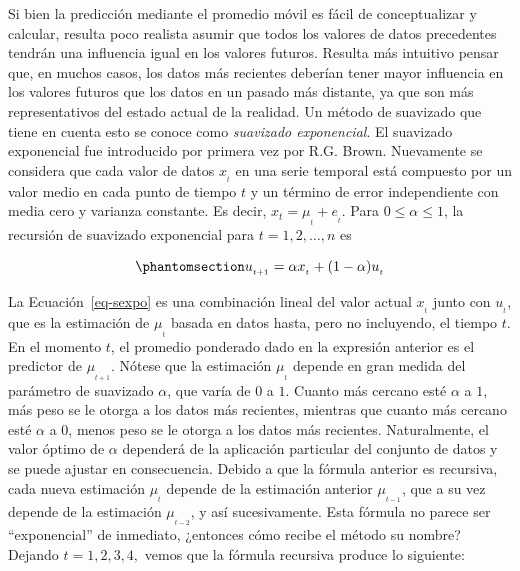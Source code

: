 \documentclass[
  us-letterpaper,
]{scrreprt}
\theoremstyle{plain}
\theoremstyle{definition}
\theoremstyle{plain}
\theoremstyle{definition}
\theoremstyle{remark}
\begin{document}
Si bien la predicción mediante el promedio móvil es fácil de
conceptualizar y calcular, resulta poco realista asumir que todos los
valores de datos precedentes tendrán una influencia igual en los valores
futuros. Resulta más intuitivo pensar que, en muchos casos, los datos
más recientes deberían tener mayor influencia en los valores futuros que
los datos en un pasado más distante, ya que son más representativos del
estado actual de la realidad. Un método de suavizado que tiene en cuenta
esto se conoce como \emph{suavizado exponencial}. El suavizado
exponencial fue introducido por primera vez por R.G. Brown. Nuevamente
se considera que cada valor de datos \(x_{_t}\) en una serie temporal
está compuesto por un valor medio en cada punto de tiempo \(t\) y un
término de error independiente con media cero y varianza constante. Es
decir, \(x_{t}=\mu_{_t}+e_{_t}\). Para \(0 \leq \alpha \leq 1\), la
recursión de suavizado exponencial para \(t =1, 2, \ldots, n\) es

\begin{equation}\phantomsection\label{eq-sexpo}{
u_{_{t+1}}=\alpha x_{_t}+ (1-\alpha)u_{_t}
}\end{equation}

La Ecuación~\ref{eq-sexpo} es una combinación lineal del valor actual
\(x_{_t}\) junto con \(u_{_t}\), que es la estimación de \(\mu_{_t}\)
basada en datos hasta, pero no incluyendo, el tiempo \(t\). En el
momento \(t\), el promedio ponderado dado en la expresión anterior es el
predictor de \(\mu_{_{t+1}}\). Nótese que la estimación \(\mu_{_t}\)
depende en gran medida del parámetro de suavizado \(\alpha\), que varía
de \(0\) a \(1\). Cuanto más cercano esté \(\alpha\) a \(1\), más peso
se le otorga a los datos más recientes, mientras que cuanto más cercano
esté \(\alpha\) a \(0\), menos peso se le otorga a los datos más
recientes. Naturalmente, el valor óptimo de \(\alpha\) dependerá de la
aplicación particular del conjunto de datos y se puede ajustar en
consecuencia. Debido a que la fórmula anterior es recursiva, cada nueva
estimación \(\mu_{_t}\) depende de la estimación anterior
\(\mu_{_{t-1}}\), que a su vez depende de la estimación
\(\mu_{_{t-2}}\), y así sucesivamente. Esta fórmula no parece ser
``exponencial'' de inmediato, ¿entonces cómo recibe el método su nombre?
Dejando \(t = 1, 2, 3, 4,\) vemos que la fórmula recursiva produce lo
siguiente:
\end{document}
